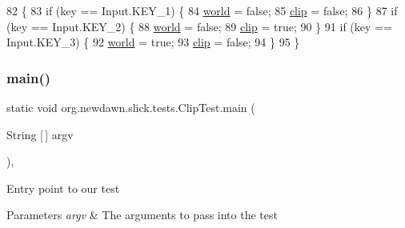 \begin{DoxyCode}
82                                             \{
83         \textcolor{keywordflow}{if} (key == Input.KEY\_1) \{
84             \mbox{\hyperlink{classorg_1_1newdawn_1_1slick_1_1tests_1_1_clip_test_a0f781bd0db027148e91292a5e1f2343e}{world}} = \textcolor{keyword}{false};
85             \mbox{\hyperlink{classorg_1_1newdawn_1_1slick_1_1tests_1_1_clip_test_a598119e064382ed677267a941ed7cfba}{clip}} = \textcolor{keyword}{false};
86         \}
87         \textcolor{keywordflow}{if} (key == Input.KEY\_2) \{
88             \mbox{\hyperlink{classorg_1_1newdawn_1_1slick_1_1tests_1_1_clip_test_a0f781bd0db027148e91292a5e1f2343e}{world}} = \textcolor{keyword}{false};
89             \mbox{\hyperlink{classorg_1_1newdawn_1_1slick_1_1tests_1_1_clip_test_a598119e064382ed677267a941ed7cfba}{clip}} = \textcolor{keyword}{true};
90         \}
91         \textcolor{keywordflow}{if} (key == Input.KEY\_3) \{
92             \mbox{\hyperlink{classorg_1_1newdawn_1_1slick_1_1tests_1_1_clip_test_a0f781bd0db027148e91292a5e1f2343e}{world}} = \textcolor{keyword}{true};
93             \mbox{\hyperlink{classorg_1_1newdawn_1_1slick_1_1tests_1_1_clip_test_a598119e064382ed677267a941ed7cfba}{clip}} = \textcolor{keyword}{false};
94         \}
95     \}
\end{DoxyCode}
\mbox{\label{classorg_1_1newdawn_1_1slick_1_1tests_1_1_clip_test_a2990ac408ea63cbbfb14369e3d1eb04a}} 
\subsubsection{\texorpdfstring{main()}{main()}}
{\footnotesize\ttfamily static void org.\+newdawn.\+slick.\+tests.\+Clip\+Test.\+main (\begin{DoxyParamCaption}\item[{String \mbox{[}$\,$\mbox{]}}]{argv }\end{DoxyParamCaption})\hspace{0.3cm}{\ttfamily [inline]}, {\ttfamily [static]}}

Entry point to our test


\begin{DoxyParams}{Parameters}
{\em argv} & The arguments to pass into the test \\
\hline
\end{DoxyParams}

